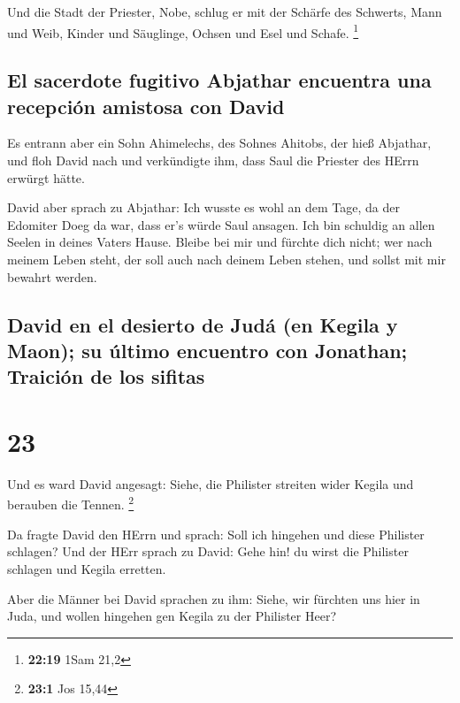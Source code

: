  Und die Stadt der Priester, Nobe, schlug er mit der
Schärfe des Schwerts, Mann und Weib, Kinder und Säuglinge, Ochsen und
Esel und Schafe. \footnote{\textbf{22:19} 1Sam 21,2}

\hypertarget{el-sacerdote-fugitivo-abjathar-encuentra-una-recepciuxf3n-amistosa-con-david}{%
\subsection{El sacerdote fugitivo Abjathar encuentra una recepción
amistosa con
David}\label{el-sacerdote-fugitivo-abjathar-encuentra-una-recepciuxf3n-amistosa-con-david}}

 Es entrann aber ein Sohn Ahimelechs, des Sohnes Ahitobs,
der hieß Abjathar, und floh David nach  und verkündigte
ihm, dass Saul die Priester des HErrn erwürgt hätte.

 David aber sprach zu Abjathar: Ich wusste es wohl an dem
Tage, da der Edomiter Doeg da war, dass er's würde Saul ansagen. Ich bin
schuldig an allen Seelen in deines Vaters Hause.  Bleibe
bei mir und fürchte dich nicht; wer nach meinem Leben steht, der soll
auch nach deinem Leben stehen, und sollst mit mir bewahrt werden.

\hypertarget{david-en-el-desierto-de-juduxe1-en-kegila-y-maon-su-uxfaltimo-encuentro-con-jonathan-traiciuxf3n-de-los-sifitas}{%
\subsection{David en el desierto de Judá (en Kegila y Maon); su último
encuentro con Jonathan; Traición de los
sifitas}\label{david-en-el-desierto-de-juduxe1-en-kegila-y-maon-su-uxfaltimo-encuentro-con-jonathan-traiciuxf3n-de-los-sifitas}}

\hypertarget{section-22}{%
\section{23}\label{section-22}}

 Und es ward David angesagt: Siehe, die Philister streiten
wider Kegila und berauben die Tennen. \footnote{\textbf{23:1} Jos 15,44}

 Da fragte David den HErrn und sprach: Soll ich hingehen
und diese Philister schlagen? Und der HErr sprach zu David: Gehe hin! du
wirst die Philister schlagen und Kegila erretten.

 Aber die Männer bei David sprachen zu ihm: Siehe, wir
fürchten uns hier in Juda, und wollen hingehen gen Kegila zu der
Philister Heer?


